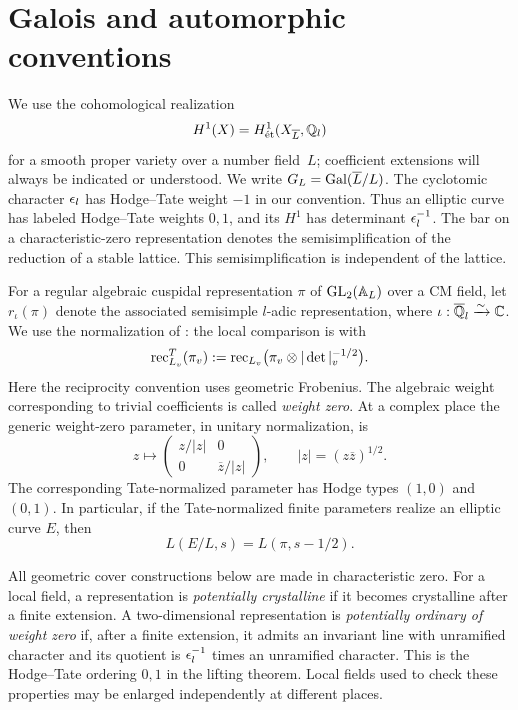 \section{Galois and automorphic conventions}\label{sec:conventions}

We use the cohomological realization
\[
 H^1(X)=H^1_{\mathrm{\acute et}}(X_{\overline L},\mathbb Q_l)
\]
for a smooth proper variety over a number field~$L$; coefficient extensions
will always be indicated or understood. We write $G_L=\operatorname{Gal}(\overline L/L)$.
The cyclotomic character $\epsilon_l$ has Hodge--Tate weight $-1$ in our convention.
Thus an elliptic curve has labeled Hodge--Tate weights $0,1$, and its
$H^1$ has determinant $\epsilon_l^{-1}$. The bar on a characteristic-zero
representation denotes the semisimplification of the reduction of a stable
lattice. This semisimplification is independent of the lattice.

For a regular algebraic cuspidal representation $\pi$ of
$\operatorname{GL}_2(\mathbb A_L)$ over a CM field, let $r_\iota(\pi)$ denote the associated
semisimple $l$-adic representation, where
$\iota:\overline{\mathbb Q}_l\xrightarrow{\sim}\mathbb C$.
We use the normalization of
\cite{HLTT,Scholze,CN}: the local comparison is with
\begin{equation}\label{eq:tate-normalization}
 \operatorname{rec}^T_{L_v}(\pi_v)
 :=\operatorname{rec}_{L_v}\bigl(\pi_v\otimes|\det|_v^{-1/2}\bigr).
\end{equation}
Here the reciprocity convention uses geometric Frobenius. The algebraic
weight corresponding to trivial coefficients is called \emph{weight zero}.
At a complex place the generic weight-zero parameter, in unitary
normalization, is
\begin{equation}\label{eq:infinity-parameter}
 z\longmapsto
 \begin{pmatrix}z/|z|&0\\0&\overline z/|z|\end{pmatrix},
 \qquad |z|=(z\overline z)^{1/2}.
\end{equation}
The corresponding Tate-normalized parameter has Hodge types $(1,0)$ and
$(0,1)$. In particular, if the Tate-normalized finite parameters realize
an elliptic curve $E$, then
\begin{equation}\label{eq:L-shift}
 L(E/L,s)=L(\pi,s-1/2).
\end{equation}

All geometric cover constructions below are made in characteristic zero.
For a local field, a representation is \emph{potentially crystalline} if
it becomes crystalline after a finite extension. A two-dimensional
representation is \emph{potentially ordinary of weight zero} if, after a
finite extension, it admits an invariant line with unramified character
and its quotient is $\epsilon_l^{-1}$ times an unramified character. This is
the Hodge--Tate ordering $0,1$ in the lifting theorem. Local fields used
to check these properties may be enlarged independently at different places.
